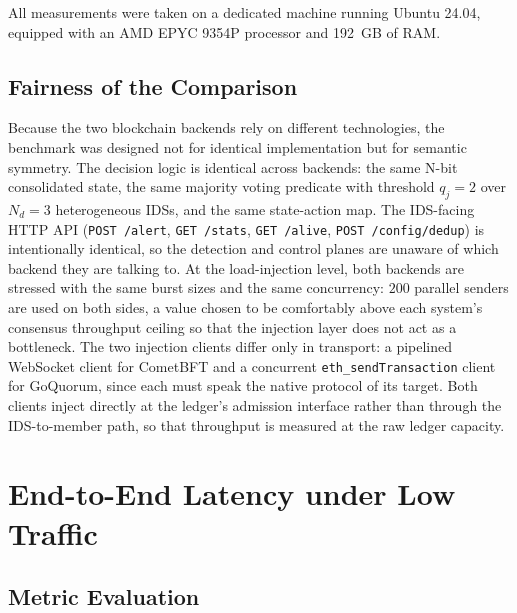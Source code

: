 All measurements were taken on a dedicated machine running Ubuntu 24.04, equipped with an AMD EPYC 9354P processor and 192~GB of RAM.

\subsection{Fairness of the Comparison}
\label{subsec:exp_fairness}

Because the two blockchain backends rely on different technologies, the benchmark was designed not for identical implementation but for semantic symmetry. The decision logic is identical across backends: the same N-bit consolidated state, the same majority voting predicate with threshold $q_j=2$ over $N_d=3$ heterogeneous IDSs, and the same state-action map. The IDS-facing HTTP API (\texttt{POST /alert}, \texttt{GET /stats}, \texttt{GET /alive}, \texttt{POST /config/dedup}) is intentionally identical, so the detection and control planes are unaware of which backend they are talking to. At the load-injection level, both backends are stressed with the same burst sizes and the same concurrency: $200$ parallel senders are used on both sides, a value chosen to be comfortably above each system's consensus throughput ceiling so that the injection layer does not act as a bottleneck. The two injection clients differ only in transport: a pipelined WebSocket client for CometBFT and a concurrent \texttt{eth\_sendTransaction} client for GoQuorum, since each must speak the native protocol of its target. Both clients inject directly at the ledger's admission interface rather than through the IDS-to-member path, so that throughput is measured at the raw ledger capacity.

\section{End-to-End Latency under Low Traffic}
\label{sec:exp_latency}

\subsection{Metric Evaluation}

